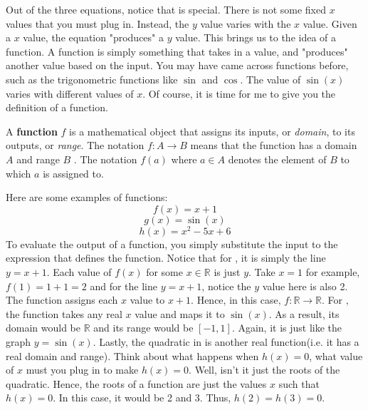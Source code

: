 Out of the three equations, notice that  is special. There is not some fixed \(x\) values that you must plug in. Instead, the \(y\) value varies with the \(x\) value. Given a \(x\) value, the equation "produces" a \(y\) value. This brings us to the idea of a function. A function is simply something that takes in a value, and "produces" another value based on the input. You may have came across functions before, such as the trigonometric functions like \(\sin\) and \(\cos\). The value of \(\sin(x)\) varies with different values of \(x\). Of course, it is time for me to give you the definition of a function. 
\begin{definition}
  A \textbf{function} \(f\) is a mathematical object that assigns its inputs, or \textit{domain}, to its outputs, or \textit{range}. The notation \(f:A \to B\) means that the function has a domain \(A\) and range \(B\) \footnotemark. The notation \(f(a)\) where \(a \in A\) denotes the element of \(B\) to which \(a\) is assigned to.    
\end{definition}
\begin{example}
  Here are some examples of functions:
  \begin{equation}
    f(x)=x+1 \label{x+1}
  \end{equation}
  \begin{equation}
    \label{sin}
    g(x)=\sin(x)
  \end{equation}
  \begin{equation}
    \label{quadratic}
    h(x)=x^2-5x+6
  \end{equation}
  To evaluate the output of a function, you simply substitute the input to the expression that defines the function. Notice that for , it is simply the line \(y=x+1\). Each value of \(f(x)\) for some \(x \in \mathbb{R}\) is just \(y\). Take \(x=1\) for example, \(f(1)=1+1=2\) and for the line \(y=x+1\), notice the \(y\) value here is also 2. The function assigns each \(x\) value to \(x+1\). Hence, in this case, \(f:\mathbb{R} \to \mathbb{R}\). For  , the function takes any real \(x\) value and maps it to \(\sin(x)\). As a result, its domain would be \(\mathbb{R}\) and its range would be \([-1,1]\). Again, it is just like the graph \(y=\sin(x)\). 
  Lastly, the quadratic in  is another real function(i.e. it has a real domain and range). Think about what happens when \(h(x)=0\), what value of \(x\) must you plug in to make \(h(x)=0\). Well, isn't it just the roots of the quadratic. Hence, the roots of a function are just the values \(x\) such that \(h(x)=0\). In this case, it would be 2 and 3. Thus, \(h(2)=h(3)=0\).
\end{example}

